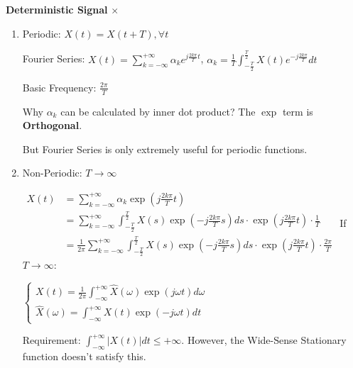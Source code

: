 \documentclass[a4paper]{article}
\begin{document}
\textbf{Deterministic Signal} {\color{red}$\times$}
\begin{enumerate}
  \item Periodic: $X(t) = X(t + T), \forall t$

Fourier Series: $X(t)=\sum_{k=-\infty}^{+\infty}\alpha_k e^{j\frac{2k\pi}{T}t}$,
$\alpha_k=\frac 1T\int_{-\frac T2}^{\frac T2}X(t)e^{-j\frac{2k\pi}{T}}dt$

Basic Frequency: $\frac{2\pi}{T}$

Why $\alpha_k$ can be calculated by inner dot product? The $\exp$ term is \textbf{Orthogonal}.

But Fourier Series is only extremely useful for periodic functions.

\item Non-Periodic: $T\to\infty$

$\begin{aligned}
X(t) &= \sum_{k=-\infty}^{+\infty} \alpha_k \exp\left(j\frac{2k\pi}{T}t\right) \\
&= \sum_{k=-\infty}^{+\infty} \int_{-\frac{T}{2}}^{\frac{T}{2}} X(s) \exp\left(-j\frac{2k\pi}{T}s\right) ds \cdot \exp\left(j\frac{2k\pi}{T}t\right) \cdot \frac{1}{T} \\
&= \frac{1}{2\pi} \sum_{k=-\infty}^{+\infty} \int_{-\frac{T}{2}}^{\frac{T}{2}} X(s) \exp\left(-j\frac{2k\pi}{T}s\right) ds \cdot \exp\left(j\frac{2k\pi}{T}t\right) \cdot \frac{2\pi}{T}
\end{aligned}$
If $T\to\infty$:

$\begin{cases}
  X(t) =\frac{1}{2\pi}\int_{-\infty}^{+\infty}\hat X(\omega)\exp(j\omega t)d\omega \\
  \hat X(\omega)=\int_{-\infty}^{+\infty}X(t)\exp(-j\omega t)dt
\end{cases}$

Requirement: $\int_{-\infty}^{+\infty}|X(t)|dt \leq +\infty$. However, the Wide-Sense Stationary function doesn't satisfy this.


\end{enumerate}
\end{document}
